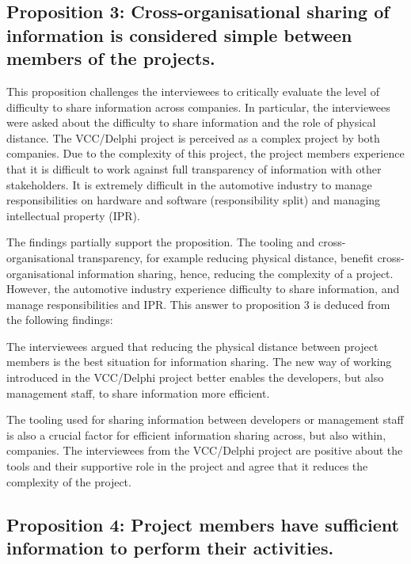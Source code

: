 \subsection{Proposition 3: Cross-organisational sharing of information is considered simple between members of the projects.}

This proposition challenges the interviewees to critically evaluate the level of difficulty to share information across companies. In particular, the interviewees were asked about the difficulty to share information and the role of physical distance. The VCC/Delphi project is perceived as a complex project by both companies. Due to the complexity of this project, the project members experience that it is difficult to work against full transparency of information with other stakeholders. It is extremely difficult in the automotive industry to manage responsibilities on hardware and software (responsibility split) and managing intellectual property (IPR).

The findings partially support the proposition. The tooling and cross-organisational transparency, for example reducing physical distance, benefit cross-organisational information sharing, hence, reducing the complexity of a project. However, the automotive industry experience difficulty to share information, and manage responsibilities and IPR. This answer to proposition 3 is deduced from the following findings:

 The interviewees argued that reducing the physical distance between project members is the best situation for information sharing. The new way of working introduced in the VCC/Delphi project better enables the developers, but also management staff, to share information more efficient.

 The tooling used for sharing information between developers or management staff is also a crucial factor for efficient information sharing across, but also within, companies. The interviewees from the VCC/Delphi project are positive about the tools and their supportive role in the project and agree that it reduces the complexity of the project.

 

\subsection{Proposition 4: Project members have sufficient information to perform their activities.}

